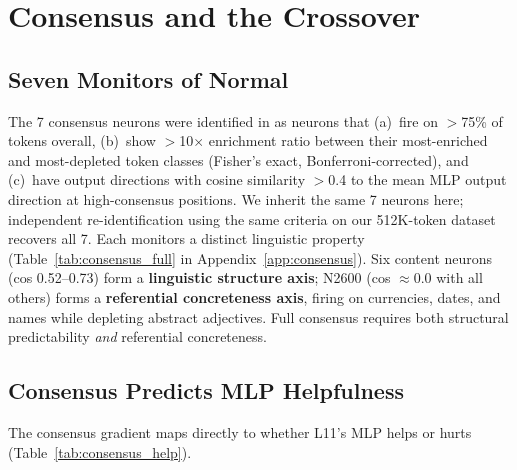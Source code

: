 \documentclass{article}
\begin{document}
\section{Consensus and the Crossover}
\label{sec:consensus}

\subsection{Seven Monitors of Normal}

The 7 consensus neurons were identified in \citet{balogh2026discrete}
as neurons that (a)~fire on $>$75\% of tokens overall,
(b)~show $>$10$\times$ enrichment ratio between their most-enriched
and most-depleted token classes (Fisher's exact, Bonferroni-corrected),
and (c)~have output directions with cosine similarity $>$0.4
to the mean MLP output direction at high-consensus positions.
We inherit the same 7 neurons here; independent re-identification
using the same criteria on our 512K-token dataset recovers all 7.
Each monitors a distinct linguistic property
(Table~\ref{tab:consensus_full} in Appendix~\ref{app:consensus}).
Six content neurons (cos 0.52--0.73) form a \textbf{linguistic structure axis};
N2600 (cos $\approx 0.0$ with all others) forms a \textbf{referential
concreteness axis}, firing on currencies, dates, and names while depleting
abstract adjectives.
Full consensus requires both structural predictability \emph{and} referential
concreteness.

\subsection{Consensus Predicts MLP Helpfulness}

The consensus gradient maps directly to whether L11's MLP helps or hurts
(Table~\ref{tab:consensus_help}).
\end{document}
